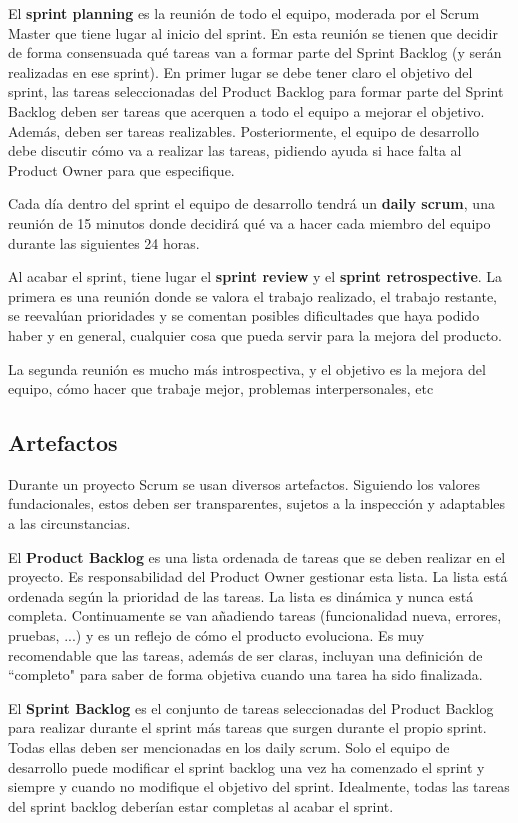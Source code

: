 \documentclass[openright,twoside,12pt]{book}
\begin{document}
El \textbf{sprint planning} es la reunión de todo el equipo, moderada por el Scrum Master que tiene lugar al inicio del sprint. En esta reunión se tienen que decidir de forma consensuada qué tareas van a formar parte del Sprint Backlog (y serán realizadas en ese sprint). En primer lugar se debe tener claro el objetivo del sprint, las tareas seleccionadas del Product Backlog para formar parte del Sprint Backlog deben ser tareas que acerquen a todo el equipo a mejorar el objetivo. Además, deben ser tareas realizables. Posteriormente, el equipo de desarrollo debe discutir cómo va a realizar las tareas, pidiendo ayuda si hace falta al Product Owner para que especifique.

Cada día dentro del sprint el equipo de desarrollo tendrá un \textbf{daily scrum}, una reunión de 15 minutos donde decidirá qué va a hacer cada miembro del equipo durante las siguientes 24 horas.

Al acabar el sprint, tiene lugar el \textbf{sprint review} y el \textbf{sprint retrospective}. La primera es una reunión donde se valora el trabajo realizado, el trabajo restante, se reevalúan prioridades y se comentan posibles dificultades que haya podido haber y en general, cualquier cosa que pueda servir para la mejora del producto.

La segunda reunión es mucho más introspectiva, y el objetivo es la mejora del equipo, cómo hacer que trabaje mejor, problemas interpersonales, etc

\subsection{Artefactos}

Durante un proyecto Scrum se usan diversos artefactos. Siguiendo los valores fundacionales, estos deben ser transparentes, sujetos a la inspección y adaptables a las circunstancias.

El \textbf{Product Backlog} es una lista ordenada de tareas que se deben realizar en el proyecto. Es responsabilidad del Product Owner gestionar esta lista. La lista está ordenada según la prioridad de las tareas. La lista es dinámica y nunca está completa. Continuamente se van añadiendo tareas (funcionalidad nueva, errores, pruebas, ...) y es un reflejo de cómo el producto evoluciona. Es muy recomendable que las tareas, además de ser claras, incluyan una definición de ``completo" para saber de forma objetiva cuando una tarea ha sido finalizada.

El \textbf{Sprint Backlog} es el conjunto de tareas seleccionadas del Product Backlog para realizar durante el sprint más tareas que surgen durante el propio sprint. Todas ellas deben ser mencionadas en los daily scrum. Solo el equipo de desarrollo puede modificar el sprint backlog una vez ha comenzado el sprint y siempre y cuando no modifique el objetivo del sprint. Idealmente, todas las tareas del sprint backlog deberían estar completas al acabar el sprint.
\end{document}
